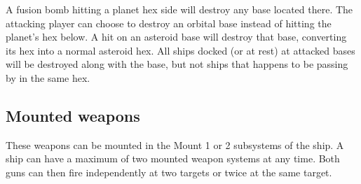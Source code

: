 \documentclass[a4paper,12pt,notitlepage,twocolumn]{article}
\begin{document}
\begin{itemize}
  A fusion bomb hitting a planet hex side will destroy any base
  located there. The attacking player can choose to destroy an orbital
  base instead of hitting the planet's hex below. A hit on an asteroid
  base will destroy that base, converting its hex into a normal
  asteroid hex. All ships docked (or at rest) at attacked bases will
  be destroyed along with the base, but not ships that happens to be
  passing by in the same hex.

\end{itemize}

\subsection{Mounted weapons}

These weapons can be mounted in the Mount 1 or 2 subsystems of the
ship. A ship can have a maximum of two mounted weapon systems at any
time. Both guns can then fire independently at two targets or twice at
the same target. 
\end{document}

